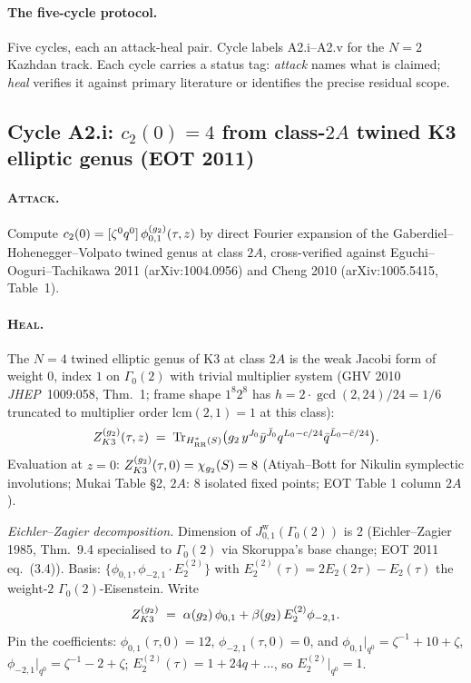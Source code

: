 \paragraph{The five-cycle protocol.}
Five cycles, each an attack-heal pair. Cycle labels A2.i--A2.v for
the $N=2$ Kazhdan track. Each cycle carries a status tag: \emph{attack}
names what is claimed; \emph{heal} verifies it against primary literature
or identifies the precise residual scope.

\subsection{Cycle A2.i: $c_2(0) = 4$ from class-$2A$ twined K3 elliptic
genus (EOT 2011)}
\label{subsec:a2-cycle-i}

\paragraph{\textsc{Attack}.}
Compute $c_2(0) = [\zeta^0 q^0]\,\phi^{(g_2)}_{0,1}(\tau, z)$ by direct Fourier
expansion of the Gaberdiel--Hohenegger--Volpato twined genus at class
$2A$, cross-verified against Eguchi--Ooguri--Tachikawa 2011
(arXiv:1004.0956) and Cheng 2010 (arXiv:1005.5415, Table~1).

\paragraph{\textsc{Heal}. \ClaimStatusTheorem}
The $N{=}4$ twined elliptic genus of K3 at class $2A$ is the weak Jacobi
form of weight $0$, index $1$ on $\Gamma_0(2)$ with trivial multiplier
system (GHV 2010 \emph{JHEP}~1009:058, Thm.~1; frame shape $1^{8}2^{8}$
has $h = 2 \cdot \gcd(2, 24)/24 = 1/6$ truncated to multiplier order
$\mathrm{lcm}(2,1) = 1$ at this class):
\[
  Z^{(g_2)}_{K3}(\tau, z)
  \;=\; \operatorname{Tr}_{H^*_{\mathrm{RR}}(S)}\bigl( g_2\,y^{J_0}\bar y^{\bar J_0}
     q^{L_0 - c/24} \bar q^{\bar L_0 - \bar c/24} \bigr).
\]
Evaluation at $z = 0$: $Z^{(g_2)}_{K3}(\tau, 0) = \chi_{g_2}(S) = 8$
(Atiyah--Bott for Nikulin symplectic involutions; Mukai Table \S 2,
$2A$: $8$ isolated fixed points; EOT Table 1 column $2A$).

\emph{Eichler--Zagier decomposition.} Dimension of
$J^{\mathrm{w}}_{0,1}(\Gamma_0(2))$ is $2$ (Eichler--Zagier 1985,
Thm.~9.4 specialised to $\Gamma_0(2)$ via Skoruppa's base change;
EOT 2011 eq.~(3.4)). Basis: $\{\phi_{0,1}, \phi_{-2,1} \cdot E_2^{(2)}\}$
with $E_2^{(2)}(\tau) = 2E_2(2\tau) - E_2(\tau)$ the weight-$2$
$\Gamma_0(2)$-Eisenstein. Write
\[
  Z^{(g_2)}_{K3} \;=\; \alpha(g_2)\,\phi_{0,1} + \beta(g_2)\,E_2^{(2)}\phi_{-2,1}.
\]
Pin the coefficients: $\phi_{0,1}(\tau, 0) = 12$,
$\phi_{-2,1}(\tau, 0) = 0$, and $\phi_{0,1}|_{q^0} = \zeta^{-1} + 10 + \zeta$,
$\phi_{-2,1}|_{q^0} = \zeta^{-1} - 2 + \zeta$; $E_2^{(2)}(\tau) = 1 + 24 q + \ldots$,
so $E_2^{(2)}|_{q^0} = 1$.

